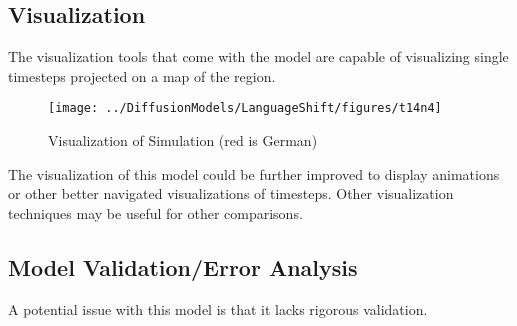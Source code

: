 \documentclass{article}
\begin{document}
\subsection{Visualization}
The visualization tools that come with the model are capable of visualizing single timesteps projected on a map of the region.

\begin{figure}[hp!]
\centering
\texttt{[image: ../DiffusionModels/LanguageShift/figures/t14n4]}
\caption[]{Visualization of Simulation (red is German)}
\label{visualization}
\end{figure}

The visualization of this model could be further improved to display animations or other better navigated visualizations of timesteps. Other visualization techniques may be useful for other comparisons.

\subsection{Model Validation/Error Analysis}
A potential issue with this model is that it lacks rigorous validation. 
\end{document}
